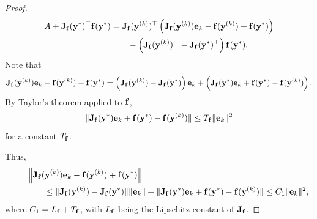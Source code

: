 \documentclass[onefignum,onetabnum]{siamart171218}
\newcommand{\bJ}{{\bf J}}
\newcommand{\be}{{\bf e}}
\newcommand{\bff}{{\bf f}}
\newcommand{\by}{{\bf y}}
\begin{document}
\begin{proof}
\begin{align}\label{eq: A}
A +\bJ_{\bf f}(\by^*)^\top \bff(\by^*) &= \bJ_{\bf f}(\by^{(k)})^\top \left( \bJ_{\bf f}(\by^{(k)})\be_k - \bff(\by^{(k)})+ \bff(\by^*)\right) \notag \\
& \qquad {} - \left(\bJ_{\bf f}(\by^{(k)})^\top -\bJ_{\bf f}(\by^*)^\top \right) \bff(\by^*). 
\end{align}
Note that
\begin{equation*}
\bJ_{\bf f}(\by^{(k)})\be_k - \bff(\by^{(k)}) +\bff(\by^*) 
=   \left(\bJ_{\bf f}(\by^{(k)})- \bJ_{\bf f}(\by^*)\right)\be_k + \left(\bJ_{\bf f}(\by^*)\be_k+\bff(\by^*) -\bff(\by^{(k)})\right) .
\end{equation*}
By Taylor's theorem applied to $\bff$,
\[\|\bJ_{\bf f}(\by^*)\be_k+\bff(\by^*) -\bff(\by^{(k)}) \| \le T_\bff \| \be_k \|^2 \]
for a constant $T_\bff$.

Thus,
\begin{align}\label{eq: bound A1}
\qquad &\left\| \bJ_{\bf f}(\by^{(k)})\be_k  -  \bff(\by^{(k)}) + \bff(\by^*) \right\| \notag \\
& \qquad \leq \| \bJ_{\bf f}(\by^{(k)}) - \bJ_{\bf f}(\by^*) \| \|\be_k\| +  \|\bJ_{\bf f}(\by^*)\be_k+\bff(\by^*) -\bff(\by^{(k)}) \|
\leq C_1 \|\be_k\|^2,
\end{align}
where $C_1 = L_\bff + T_\bff$, with $L_\bff$ being the Lipschitz constant of $\bJ_{\bf f}$.


\end{proof}
\end{document}
